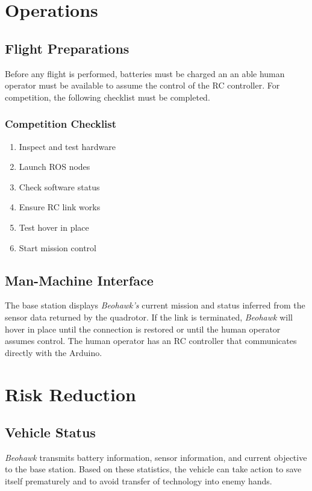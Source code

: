 \documentclass[12pt, letterpaper]{article}
\begin{document}
\section{Operations}

\subsection{Flight Preparations}
Before any flight is performed, batteries must be charged an an able human operator must be available to assume the control of the RC controller.  For competition, the following checklist must be completed.

\subsubsection{Competition Checklist}
\begin{enumerate}
  \item Inspect and test hardware
  \item Launch ROS nodes
  \item Check software status
  \item Ensure RC link works
  \item Test hover in place
  \item Start mission control
\end{enumerate}

\subsection{Man-Machine Interface}
The base station displays \textit{Beohawk's} current mission and status inferred from the sensor data returned by the quadrotor.  If the link is terminated, \textit{Beohawk} will  hover in place until the connection is restored or until the human operator assumes control. The human operator has an RC controller that communicates directly with the Arduino.


\section{Risk Reduction}
\subsection{Vehicle Status}
\textit{Beohawk} transmits battery information, sensor information, and current objective to the base station. Based on these statistics, the vehicle can take action to save itself prematurely and to avoid transfer of technology into enemy hands. 
\end{document}
